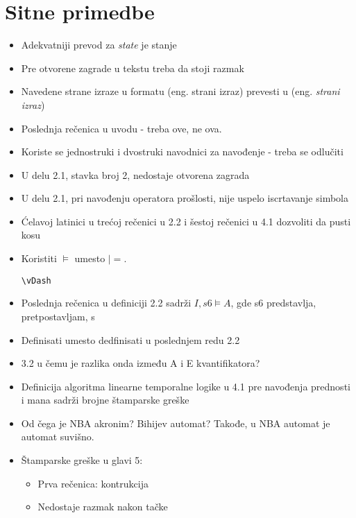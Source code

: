 \documentclass[a4paper]{report}
\begin{document}
\section{Sitne primedbe}
\begin{itemize}
\item Adekvatniji prevod za {\em state} je stanje
\item Pre otvorene zagrade u tekstu treba da stoji razmak
\item Navedene strane izraze u formatu (eng. strani izraz) prevesti u (eng. {\em strani izraz})
\item Poslednja rečenica u uvodu - treba ove, ne ova.
\item Koriste se jednostruki i dvostruki navodnici za navođenje - treba se odlučiti
\item U delu 2.1, stavka broj 2, nedostaje otvorena zagrada
\item U delu 2.1, pri navođenju operatora prošlosti, nije uspelo iscrtavanje simbola
\item Ćelavoj latinici u trećoj rečenici u 2.2 i šestoj rečenici u 4.1 dozvoliti da pusti kosu
\item Koristiti 
\begin{math}
\vDash 
\end{math}
umesto \begin{math}|=\end{math}.
\begin{verbatim}
\vDash
\end{verbatim}
\item Poslednja rečenica u definiciji 2.2 sadrži
\begin{math}
    I, s6 \vDash A 
\end{math}, gde s6 predstavlja, pretpostavljam, s
\item Definisati umesto dedfinisati u poslednjem redu 2.2
\item 3.2 u čemu je razlika onda između A i E kvantifikatora?
\item Definicija algoritma linearne temporalne logike u 4.1 pre navođenja prednosti i mana sadrži
brojne štamparske greške
\item Od čega je NBA akronim? Bihijev automat? Takođe, u NBA automat je automat suvišno.
\item Štamparske greške u glavi 5:
\begin{itemize}
\item Prva rečenica: kontrukcija
\item Nedostaje razmak nakon tačke

\end{itemize}
\end{itemize}
\end{document}
